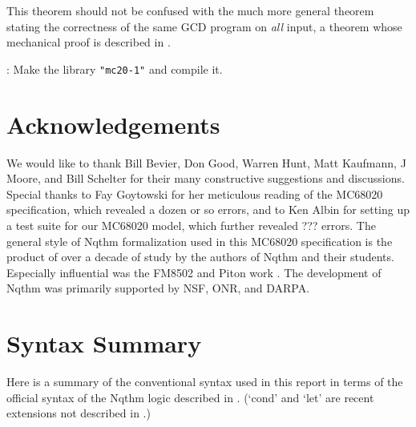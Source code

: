  This
 theorem should not be confused with the much more general theorem
 stating the correctness of the same GCD program on {\em all} input, a theorem
 whose mechanical proof is described in \cite{Boyer-Yu-91}.


:   Make the library {\tt{"mc20-1"}} and compile it.

\addvspace{18pt}

 
\newpage\section{Acknowledgements}

We would like to thank Bill Bevier, Don Good, Warren Hunt, Matt
Kaufmann, J Moore, and Bill Schelter for their many constructive
suggestions and discussions.  Special thanks to Fay Goytowski for her
meticulous reading of the MC68020 specification, which revealed a
dozen or so errors, and to Ken Albin for setting up a test suite for
our MC68020 model, which further revealed ??? errors. The general
style of Nqthm formalization used in this MC68020 specification is the
product of over a decade of study by the authors of Nqthm and their
students.  Especially influential was the FM8502 and Piton work
\cite{m:stack}.  The development of Nqthm was primarily supported by
NSF, ONR, and DARPA.

\newpage
\section{Syntax Summary}
\label{syntax}
        Here is a summary of the conventional syntax used in this report in terms of the official syntax
        of the Nqthm logic described in \cite{BM-88}.  (`cond' and `let' are recent extensions not
        described in \cite{BM-88}.)

